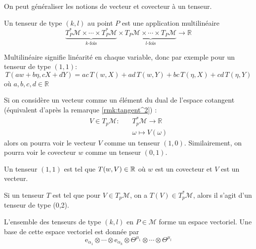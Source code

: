 On peut généraliser les notions de vecteur et covecteur à un tenseur. 
\begin{theoremframe}
    \begin{defi}
        Un tenseur de type $(k, l)$ au point $P$ est une application multilinéaire
        \begin{equation}
            \underbrace{T^*_{P}\mathcal{M} \times \cdots \times T^*_{P}\mathcal{M}}_\text{$k$-fois} \times \underbrace{T_{P}\mathcal{M} \times \cdots \times T_{P}\mathcal{M}}_\text{$l$-fois}  \to \mathbb{R}
        \end{equation}

        Multilinéaire signifie linéarité en chaque variable, donc par exemple pour un tenseur de type $(1,1)$: 
        \begin{equation}
        T(aw +b\eta, cX +dY) = ac \, T(w, X) + ad \, T(w, Y) + bc \, T(\eta, X) +cd \, T(\eta, Y)
        \end{equation}
        où $a,b, c ,d \in \mathbb{R}$
    \end{defi}
\end{theoremframe}
\begin{exmp}
    Si on considère un vecteur comme un élément du dual de l'espace cotangent (équivalent d'après la remarque \ref{rmk:tangent^2}) :
\begin{align*}
    V \in T_{p}\mathcal{M} : \quad &T^*_{p}\mathcal{M} \longrightarrow \mathbb{R}\\
    & \omega \longmapsto V(\omega)
\end{align*}
alors on pourra voir le vecteur $V$ comme un tenseur $(1, 0)$. Similairement, on pourra voir le covecteur $w$ comme un tenseur $(0, 1)$. 
\end{exmp}
\begin{exmp}
    Un tenseur $(1, 1)$ est tel que $T(w,V) \in \mathbb{R}$ où $w$ est un covecteur et $V$ est un vecteur. 
\end{exmp}
\begin{exmp}
    Si un tenseur $T$ est tel que pour $V\in T_p\mathcal{M}$, on a $T(V) \in T^*_p\mathcal{M}$, alors il s'agit d'un tenseur de type (0,2).
\end{exmp}
\begin{theoremframe}
    \begin{propri}
        L'ensemble des tenseurs de type $(k, l)$ en $P\in \mathcal{M}$ forme un espace vectoriel. Une base de cette espace vectoriel est donnée par 
        \begin{equation}
        \mathrm{e}_{\alpha_1} \otimes \cdots \otimes \mathrm{e}_{\alpha_k} \otimes \Theta^{\mu _1}\otimes \cdots \otimes \Theta^{\mu _l}
        \end{equation}
    \end{propri}
\end{theoremframe}
